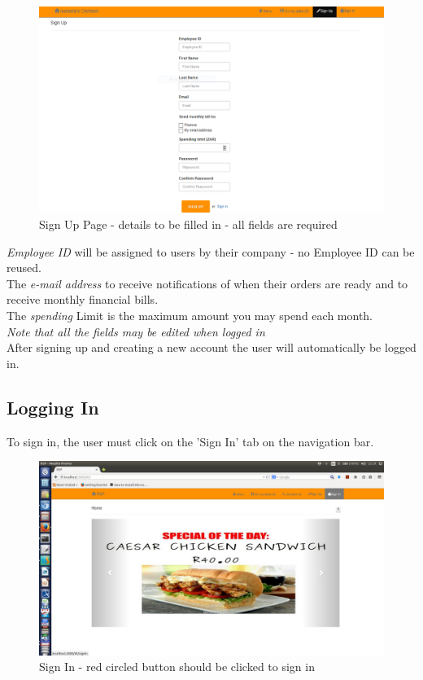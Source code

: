 \documentclass[a4paper,12pt]{article}
\begin{document}
\begin{figure}[H]
  \centering
    \includegraphics[width=1.0\textwidth]{screenshots/signUpPage.png}
    \caption{Sign Up Page - details to be filled in - all fields are required} 
\end{figure}

{\em Employee ID } will be assigned to users by their company - no Employee ID can be reused.\\
The {\em e-mail address} to receive notifications of when their orders are ready and to receive monthly financial bills. \\
The {\em spending} Limit is the maximum amount you may spend each month.\\

{\em Note that all the fields may be edited when logged in} \\

After signing up and creating a new account the user will automatically be logged in. 

\subsection{Logging In}
To sign in, the user must click on the 'Sign In' tab on the navigation bar.

\begin{figure}[H]
  \centering
    \includegraphics[width=1.0\textwidth]{screenshots/signIn.png}
    \caption{Sign In - red circled button should be clicked to sign in} 
\end{figure}
\end{document}
